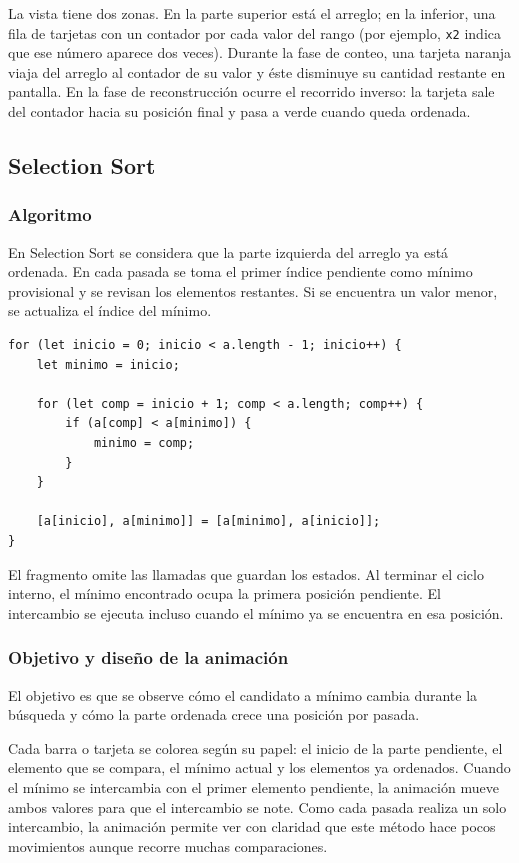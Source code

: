 \documentclass[12pt,a4paper]{article}
\begin{document}
La vista tiene dos zonas. En la parte superior está el arreglo; en la inferior, una fila de tarjetas con un contador por cada valor del rango (por ejemplo, \texttt{x2} indica que ese número aparece dos veces). Durante la fase de conteo, una tarjeta naranja viaja del arreglo al contador de su valor y éste disminuye su cantidad restante en pantalla. En la fase de reconstrucción ocurre el recorrido inverso: la tarjeta sale del contador hacia su posición final y pasa a verde cuando queda ordenada.

\subsection{Selection Sort}

\subsubsection{Algoritmo}

En Selection Sort se considera que la parte izquierda del arreglo ya está ordenada. En cada pasada se toma el primer índice pendiente como mínimo provisional y se revisan los elementos restantes. Si se encuentra un valor menor, se actualiza el índice del mínimo.

\begin{lstlisting}[caption={Búsqueda del mínimo e intercambio en Selection Sort}]
for (let inicio = 0; inicio < a.length - 1; inicio++) {
    let minimo = inicio;

    for (let comp = inicio + 1; comp < a.length; comp++) {
        if (a[comp] < a[minimo]) {
            minimo = comp;
        }
    }

    [a[inicio], a[minimo]] = [a[minimo], a[inicio]];
}
\end{lstlisting}

El fragmento omite las llamadas que guardan los estados. Al terminar el ciclo interno, el mínimo encontrado ocupa la primera posición pendiente. El intercambio se ejecuta incluso cuando el mínimo ya se encuentra en esa posición.

\subsubsection{Objetivo y diseño de la animación}

El objetivo es que se observe cómo el candidato a mínimo cambia durante la búsqueda y cómo la parte ordenada crece una posición por pasada.

Cada barra o tarjeta se colorea según su papel: el inicio de la parte pendiente, el elemento que se compara, el mínimo actual y los elementos ya ordenados. Cuando el mínimo se intercambia con el primer elemento pendiente, la animación mueve ambos valores para que el intercambio se note. Como cada pasada realiza un solo intercambio, la animación permite ver con claridad que este método hace pocos movimientos aunque recorre muchas comparaciones.
\end{document}

